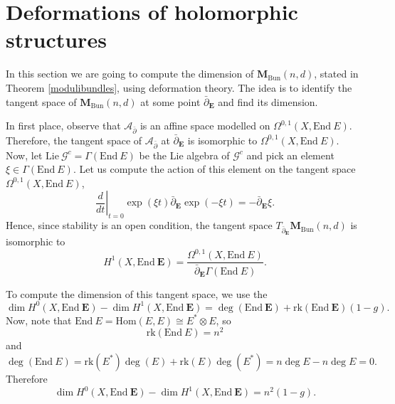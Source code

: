\documentclass[12pt,a4paper]{book}
\theoremstyle{definition} \newtheorem{defn}[thm]{Definition}
\theoremstyle{definition} \newtheorem{ejemplo}[thm]{Example}
\theoremstyle{remark} \newtheorem{rem}[thm]{Remark}
\def\AA{\mathscr{A}}
\def\GG{\mathscr{G}}
\def\rk{\mathrm{rk}}
\def\Lie{\mathrm{Lie}}
\def\End{\mathrm{End}}
\def\Hom{\mathrm{Hom}}
\def\Bun{\mathbf{M}_{\mathrm{Bun}}}
\def\delbar{\bar{\partial}}
\newcommand{\ve}[1]{\mathbf{#1}}
\let\emph\relax
\begin{document}
	   \section{Deformations of holomorphic structures}\label{deformationsholomorphic}
	   In this section we are going to compute the dimension of $\Bun(n,d)$, stated in Theorem \ref{modulibundles}, using deformation theory. The idea is to identify the tangent space of $\Bun(n,d)$ at some point $\delbar_\ve{E}$ and find its dimension. 

	   In first place, observe that $\AA_{\delbar}$ is an affine space modelled on $\Omega^{0,1}(X,\End\ E)$. Therefore, the tangent space of $\AA_{\delbar}$ at $\delbar_{\ve{E}}$ is isomorphic to $\Omega^{0,1}(X,\End\ E)$. Now, let $\Lie\ \GG^c = \Gamma(\End\ E)$ be the Lie algebra of $\GG^c$ and pick an element $\xi \in \Gamma(\End\ E)$. Let us compute the action of this element on the tangent space $\Omega^{0,1}(X,\End\ E)$,
	   \begin{equation*}
	     \left. \frac{d}{dt} \right|_{t=0} \exp(\xi t)  \delbar_{\ve{E}} \exp(-\xi t) = -\delbar_\ve{E} \xi.
	   \end{equation*}
	   Hence, since stability is an open condition, the tangent space $T_{\delbar_{\ve{E}}}\Bun(n,d)$ is isomorphic to
	   \begin{equation*}
	     H^1(X,\End\ \ve{E})=\frac{\Omega^{0,1}(X,\End\ E)}{\delbar_\ve{E} \Gamma(\End\ E)}.
	   \end{equation*}

	   To compute the dimension of this tangent space, we use the \emph{Riemann-Roch theorem}
	   \begin{equation*}
	     \dim H^0(X,\End\ \ve{E}) - \dim H^1(X,\End\ \ve{E})=\deg(\End\ \ve{E}) + \rk(\End\ \ve{E})(1-g).
	   \end{equation*}
	   Now, note that $\End\ E=\Hom(E,E)\cong E^*\otimes E$, so
	   \begin{equation*}
	     \rk(\End\ E)=n^2
	   \end{equation*}
	   and
	   \begin{equation*}
	     \deg(\End\ E)=\rk(E^*)\deg(E) + \rk(E)\deg(E^*)=n\deg E - n\deg E=0.
	   \end{equation*}
	   Therefore
	   \begin{equation*}
	     \dim H^0(X,\End\ \ve{E}) - \dim H^1(X,\End\ \ve{E})=n^2(1-g).
	   \end{equation*}
\end{document}
